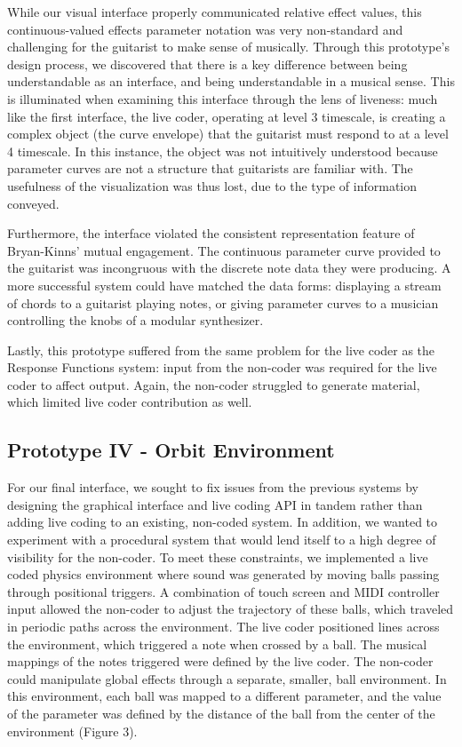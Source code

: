 \documentclass{nime-alternate}
\begin{document}
While our visual interface properly communicated relative effect values, this continuous-valued effects parameter notation was very non-standard and challenging for the guitarist to make sense of musically. Through this prototype's design process, we discovered that there is a key difference between being understandable as an interface, and being understandable in a musical sense. This is illuminated when examining this interface through the lens of liveness: much like the first interface, the live coder, operating at level 3 timescale, is creating a complex object (the curve envelope) that the guitarist must respond to at a level 4 timescale. In this instance, the object was not intuitively understood because parameter curves are not a structure that guitarists are familiar with. The usefulness of the visualization was thus lost, due to the type of information conveyed.

Furthermore, the interface violated the consistent representation feature of Bryan-Kinns' mutual engagement. The continuous parameter curve provided to the guitarist was incongruous with the discrete note data they were producing. A more successful system could have matched the data forms: displaying a stream of chords to a guitarist playing notes, or giving parameter curves to a musician controlling the knobs of a modular synthesizer. 

Lastly, this prototype suffered from the same problem for the live coder as the Response Functions system: input from the non-coder was required for the live coder to affect output. Again, the non-coder struggled to generate material, which limited live coder contribution as well.

\subsection{Prototype IV - Orbit Environment}
For our final interface, we sought to fix issues from the previous systems by designing the graphical interface and live coding API in tandem rather than adding live coding to an existing, non-coded system. In addition, we wanted to experiment with a procedural system that would lend itself to a high degree of visibility for the non-coder. To meet these constraints, we implemented a live coded physics environment where sound was generated by moving balls passing through positional triggers. A combination of touch screen and MIDI controller input allowed the non-coder to adjust the trajectory of these balls, which traveled in periodic paths across the environment. The live coder positioned lines across the environment, which triggered a note when crossed by a ball. The musical mappings of the notes triggered were defined by the live coder. The non-coder could manipulate global effects through a separate, smaller, ball environment. In this environment, each ball was mapped to a different parameter, and the value of the parameter was defined by the distance of the ball from the center of the environment (Figure 3).
\end{document}
